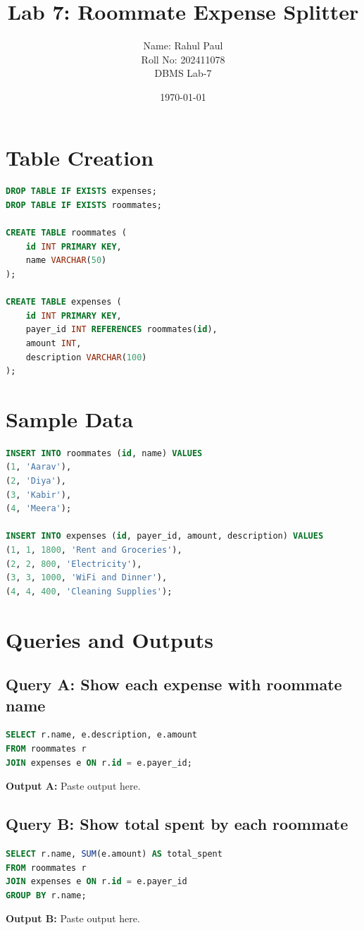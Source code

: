 \documentclass{article}
\title{Lab 7: Roommate Expense Splitter}
\author{Name: Rahul Paul \\ Roll No: 202411078 \\ DBMS Lab-7}
\date{\today}
\begin{document}
\maketitle

\section{Table Creation}
\begin{lstlisting}[language=SQL]
DROP TABLE IF EXISTS expenses;
DROP TABLE IF EXISTS roommates;

CREATE TABLE roommates (
    id INT PRIMARY KEY,
    name VARCHAR(50)
);

CREATE TABLE expenses (
    id INT PRIMARY KEY,
    payer_id INT REFERENCES roommates(id),
    amount INT,
    description VARCHAR(100)
);
\end{lstlisting}

\section{Sample Data}
\begin{lstlisting}[language=SQL]
INSERT INTO roommates (id, name) VALUES
(1, 'Aarav'),
(2, 'Diya'),
(3, 'Kabir'),
(4, 'Meera');

INSERT INTO expenses (id, payer_id, amount, description) VALUES
(1, 1, 1800, 'Rent and Groceries'),
(2, 2, 800, 'Electricity'),
(3, 3, 1000, 'WiFi and Dinner'),
(4, 4, 400, 'Cleaning Supplies');
\end{lstlisting}

\section{Queries and Outputs}

\subsection*{Query A: Show each expense with roommate name}
\begin{lstlisting}[language=SQL]
SELECT r.name, e.description, e.amount
FROM roommates r
JOIN expenses e ON r.id = e.payer_id;
\end{lstlisting}
\textbf{Output A:} Paste output here.

\subsection*{Query B: Show total spent by each roommate}
\begin{lstlisting}[language=SQL]
SELECT r.name, SUM(e.amount) AS total_spent
FROM roommates r
JOIN expenses e ON r.id = e.payer_id
GROUP BY r.name;
\end{lstlisting}
\textbf{Output B:} Paste output here.
\end{document}
